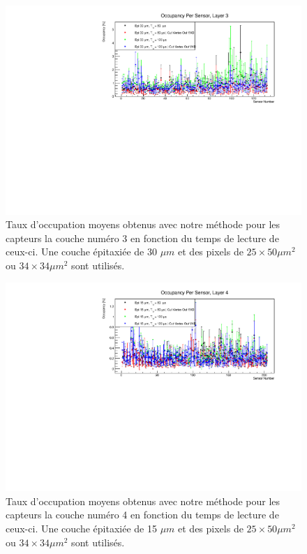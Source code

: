 \begin{appendices}
   \begin{figure}[!htb]
    \begin{center}
      \includegraphics[scale=0.80]{./figures/sensors_Readout_Time/resultOccupancyPerSensor/occupancyPerSensor_Layer3_epi30um.pdf}
      \caption{Taux d'occupation moyens obtenus avec notre m\'ethode pour les capteurs la couche num\'ero 3 en fonction du temps de lecture de ceux-ci. Une couche \'epitaxi\'ee de 30 $\mu m$ et des pixels de $25 \times 50 \mu m^2$ ou $34 \times 34 \mu m^2$ sont utilis\'es.}
      \label{fig:OccupancyLayer3_epi30um}
    \end{center}
  \end{figure}
  
   \begin{figure}[!htb]
    \begin{center}
      \includegraphics[scale=0.80]{./figures/sensors_Readout_Time/resultOccupancyPerSensor/occupancyPerSensor_Layer4_epi15um.pdf}
      \caption{Taux d'occupation moyens obtenus avec notre m\'ethode pour les capteurs la couche num\'ero 4 en fonction du temps de lecture de ceux-ci. Une couche \'epitaxi\'ee de 15 $\mu m$ et des pixels de $25 \times 50 \mu m^2$ ou $34 \times 34 \mu m^2$ sont utilis\'es.}
      \label{fig:OccupancyLayer4_epi15um}
    \end{center}
  \end{figure}


\end{appendices}
